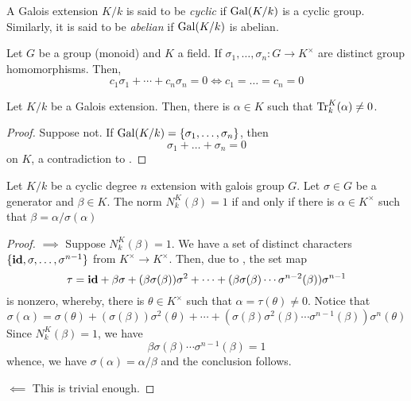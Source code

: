 \begin{definition}
    A Galois extension $K/k$ is said to be \emph{cyclic} if $\operatorname{Gal}(K/k)$ is a cyclic group. Similarly, it is said to be \emph{abelian} if $\operatorname{Gal}(K/k)$ is abelian.
\end{definition}

\begin{theorem}
    Let $G$ be a group (monoid) and $K$ a field. If $\sigma_1,\dots,\sigma_n: G\to K^\times$ are distinct group homomorphisms. Then, 
    \begin{equation*}
        c_1\sigma_1 + \cdots + c_n\sigma_n = 0 \iff c_1 = \dots = c_n = 0
    \end{equation*}
\end{theorem}

\begin{corollary}
    Let $K/k$ be a Galois extension. Then, there is $\alpha\in K$ such that $\operatorname{Tr}^K_k(\alpha)\ne0$.
\end{corollary}
\begin{proof}
    Suppose not. If $\operatorname{Gal}(K/k) = \{\sigma_1,\dots,\sigma_n\}$, then 
    \begin{equation*}
        \sigma_1 + \dots + \sigma_n = 0
    \end{equation*}
    on $K$, a contradiction to . 
\end{proof}

\begin{theorem}
    Let $K/k$ be a cyclic degree $n$ extension with galois group $G$. Let $\sigma\in G$ be a generator and $\beta\in K$. The norm $N^K_k(\beta) = 1$ if and only if there is $\alpha\in K^\times$ such that $\beta = \alpha/\sigma(\alpha)$
\end{theorem}
\begin{proof}
    $\implies$ Suppose $N^K_k(\beta) = 1$. We have a set of distinct characters $\{\mathbf{id},\sigma,\ldots,\sigma^{n - 1}\}$ from $K^\times\to K^\times$. Then, due to , the set map 
    \begin{equation*}
        \tau = \mathbf{id} + \beta\sigma + (\beta\sigma(\beta))\sigma^2 + \cdots + (\beta\sigma(\beta)\cdots\sigma^{n - 2}(\beta))\sigma^{n - 1}
    \end{equation*}
    is nonzero, whereby, there is $\theta\in K^\times$ such that $\alpha = \tau(\theta)\ne 0$. Notice that 
    \begin{equation*}
        \sigma(\alpha) = \sigma(\theta) + (\sigma(\beta))\sigma^2(\theta) + \cdots + (\sigma(\beta)\sigma^2(\beta)\cdots\sigma^{n - 1}(\beta))\sigma^n(\theta)
    \end{equation*}
    Since $N^K_k(\beta) = 1$, we have 
    \begin{equation*}
        \beta\sigma(\beta)\cdots\sigma^{n - 1}(\beta) = 1
    \end{equation*}
    whence, we have $\sigma(\alpha) = \alpha/\beta$ and the conclusion follows.

    $\impliedby$ This is trivial enough.
\end{proof}

